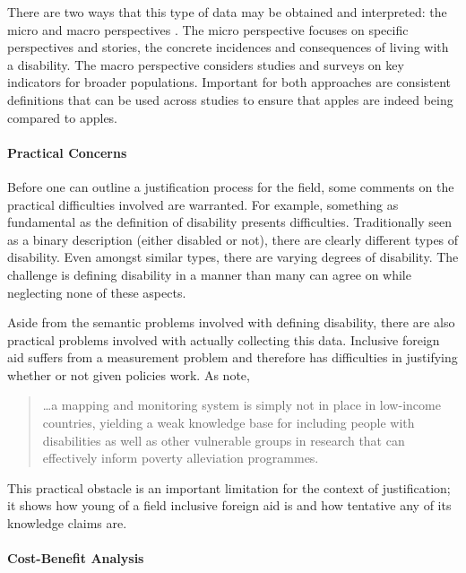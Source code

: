 \documentclass[a4paper]{article}
\begin{document}
There are two ways that this type of data may be obtained and interpreted: the
micro and macro perspectives \citep{ingstad2011disability}. The micro
perspective focuses on specific perspectives and stories, the concrete
incidences and consequences of living with a disability. The macro perspective
considers studies and surveys on key indicators for broader populations.
Important for both approaches are consistent definitions that can be used
across studies to ensure that apples are indeed being compared to apples.

\paragraph{Practical Concerns}

Before one can outline a justification process for the field, some comments on
the practical difficulties involved are warranted. For example, something as
fundamental as the definition of disability presents difficulties.
Traditionally seen as a binary description (either disabled or not), there are
clearly different types of disability. Even amongst similar types, there are
varying degrees of disability. The challenge is defining disability in a
manner than many can agree on while neglecting none of these aspects.

Aside from the semantic problems involved with defining disability, there are
also practical problems involved with actually collecting this data.
Inclusive foreign aid suffers from a measurement problem and therefore has
difficulties in justifying whether or not given policies work. As
\cite{ingstad2011disability} note,
%
\begin{quote}
    \ldots a mapping and monitoring system is simply not in place in
    low-income countries, yielding a weak knowledge base for including people
    with disabilities as well as other vulnerable groups in research that can
    effectively inform poverty alleviation programmes.
\end{quote}
%
This practical obstacle is an important limitation for the context of
justification; it shows how young of a field inclusive foreign aid is and how
tentative any of its knowledge claims are.

\paragraph{Cost-Benefit Analysis}
\end{document}
